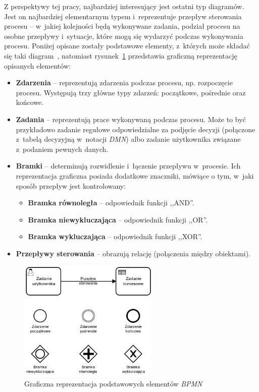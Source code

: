 Z perspektywy tej pracy, najbardziej interesujący jest ostatni typ diagramów. Jest on najbardziej elementarnym typem i~reprezentuje przepływ sterowania procesu -- w~jakiej kolejności będą wykonywane zadania, podział procesu na osobne przepływy i~sytuacje, które mogą się wydarzyć podczas wykonywania procesu. Poniżej opisane zostały podstawowe elementy, z~których może składać się taki diagram~\cite{BPMNBook}, natomiast rysunek~\ref{fig:bpmnElements} przedstawia graficzną reprezentację opisanych elementów:
\newpage
\begin{itemize}
        \item \textbf{Zdarzenia} -- reprezentują zdarzenia podczas procesu, np. rozpoczęcie procesu. Występują trzy główne typy zdarzeń: początkowe, pośrednie oraz końcowe.
        \item \textbf{Zadania} -- reprezentują prace wykonywaną podczas procesu. Może to być przykładowo zadanie regułowe odpowiedzialne za podjęcie decyzji (połączone z~tabelą decyzyjną w~notacji \emph{DMN}) albo zadanie użytkownika związane z~podaniem pewnych danych.
        \item \textbf{Bramki} -- determinują rozwidlenie i~łączenie przepływu w~procesie. Ich reprezentacja graficzna posiada dodatkowe znaczniki, mówiące o tym, w~jaki sposób przepływ jest kontrolowany:
            \begin{itemize}
                \item \textbf{Bramka równoległa} -- odpowiednik funkcji ,,AND''.
                \item \textbf{Bramka niewykluczająca} -- odpowiednik funkcji ,,OR''.
                \item \textbf{Bramka wykluczająca} -- odpowiednik funkcji ,,XOR''.
            \end{itemize}
        \item \textbf{Przepływy sterowania} -- obrazują relację (połączenia między obiektami).
\end{itemize}
\begin{figure}
    \centering
    \includegraphics[width=0.6\textwidth, height=0.4\textheight,keepaspectratio]{./assets/bpmnElements.png}
    \caption{Graficzna reprezentacja podstawowych elementów \emph{BPMN}}
    \label{fig:bpmnElements}
\end{figure} 

